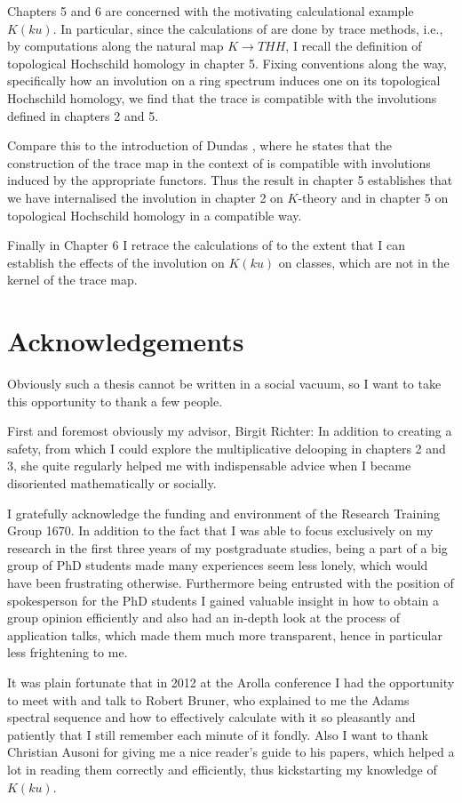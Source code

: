 Chapters 5 and 6 are concerned with the motivating calculational example $K(ku)$. In particular,
since the calculations of \cite{AuKku} are done by trace methods, i.e., by computations along
the natural map $K\rightarrow THH$, I recall the definition of topological Hochschild homology
in chapter 5. Fixing conventions along the way, specifically how an involution on a ring spectrum
induces one on its topological Hochschild homology, we find that the trace is compatible with
the involutions defined in chapters 2 and 5. 

Compare this to the introduction of Dundas \cite{D98}, where he states that the construction of the
trace map in the context of \cite{D98} 
is compatible with involutions induced by the appropriate functors. Thus the result in
chapter 5 establishes that we have internalised the involution in chapter 2 on $K$-theory
and in chapter 5 on topological Hochschild homology in a compatible way.

Finally in Chapter 6 I retrace the calculations of \cite{AuKku} to the extent that I can
establish the effects of the involution on $K(ku)$ on classes, which are not in the kernel
of the trace map.

\section*{Acknowledgements}
Obviously such a thesis cannot be written in a social vacuum, so I want to take this opportunity
to thank a few people.

First and foremost obviously my advisor, Birgit Richter: In addition to creating a safety, from
which I could explore the multiplicative delooping in chapters 2 and 3, she quite regularly helped
me with indispensable advice when I became disoriented mathematically or socially.

I gratefully acknowledge the funding and environment of the Research Training Group 1670. In addition
to the fact that I was able to focus exclusively on my research in the first three years of my
postgraduate studies, being a part of a big group of PhD students made many experiences seem less 
lonely, which would have been frustrating otherwise. Furthermore being entrusted with the position
of spokesperson for the PhD students I gained valuable insight in how to obtain a
group opinion efficiently and also had an in-depth look at the process of application talks, which
made them much more transparent, hence in particular less frightening to me.

It was plain fortunate that in 2012 at the Arolla conference I had the opportunity to meet with and
talk to Robert Bruner, who explained to me the Adams spectral sequence and how to effectively calculate
with it so pleasantly and patiently that I still remember each minute of it fondly.
Also I want to thank Christian Ausoni for giving me a nice reader's guide to his papers, which helped
a lot in reading them correctly and efficiently, thus kickstarting my knowledge of $K(ku)$.

